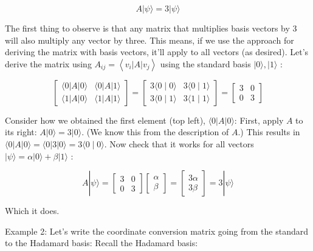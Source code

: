 \documentclass[main.tex]{subfiles}
\begin{document}
    $$
    A|\psi\rangle=3|\psi\rangle
    $$
    
    The first thing to observe is that any matrix that multiplies basis vectors by 3 will also multiply any vector by three. This means, if we use the approach for deriving the matrix with basis vectors, it'll apply to all vectors (as desired). Let's derive the matrix using $A_{i j}=\left\langle v_{i}|A| v_{j}\right\rangle$ using the standard basis $|0\rangle,|1\rangle$ :
    
    $$
    \left[\begin{array}{ll}
    \langle 0|A| 0\rangle & \langle 0|A| 1\rangle \\
    \langle 1|A| 0\rangle & \langle 1|A| 1\rangle
    \end{array}\right]=\left[\begin{array}{ll}
    3\langle 0 \mid 0\rangle & 3\langle 0 \mid 1\rangle \\
    3\langle 0 \mid 1\rangle & 3\langle 1 \mid 1\rangle
    \end{array}\right]=\left[\begin{array}{ll}
    3 & 0 \\
    0 & 3
    \end{array}\right]
    $$
    
    Consider how we obtained the first element (top left), $\langle 0|A| 0\rangle$: First, apply $A$ to its right: $A|0\rangle=3|0\rangle$. (We know this from the description of $A$.) This results in $\langle 0|A| 0\rangle=\langle 0|3| 0\rangle=3\langle 0 \mid 0\rangle$. Now check that it works for all vectors $|\psi\rangle=\alpha|0\rangle+\beta|1\rangle$ :
    
    $$
    A|\psi\rangle=\left[\begin{array}{ll}
    3 & 0 \\
    0 & 3
    \end{array}\right]\left[\begin{array}{l}
    \alpha \\
    \beta
    \end{array}\right]=\left[\begin{array}{l}
    3 \alpha \\
    3 \beta
    \end{array}\right]=3|\psi\rangle
    $$
    
    Which it does.
    
    Example 2: Let's write the coordinate conversion matrix going from the standard to the Hadamard basis: Recall the Hadamard basis:
    
\end{document}
